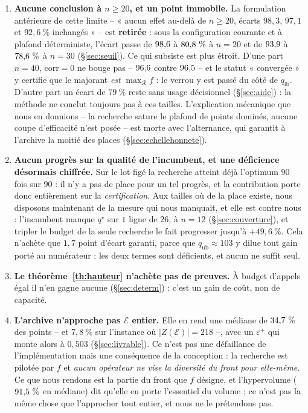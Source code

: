 \documentclass[11pt,a4paper]{article}
\theoremstyle{plain}
\theoremstyle{remark}
\newcommand{\Ecal}{\mathcal{E}}
\newcommand{\Rcal}{\mathcal{R}}
\newcommand{\qs}{q^{\star}}
\begin{document}
\begin{enumerate}[leftmargin=*,itemsep=3pt]
\item \textbf{Aucune conclusion à $n\ge 20$, et un point immobile.} La
      formulation antérieure de cette limite -- « aucun effet au-delà de
      $n\ge 20$, écarts $98{,}3$, $97{,}1$ et $92{,}6\ \%$ inchangés » -- est
      \textbf{retirée} : sous la configuration courante et à plafond
      déterministe, l'écart passe de $98{,}6{}$ à $80{,}8{}\ \%$ à $n=20$ et de
      $93{,}9{}$ à $78{,}6{}\ \%$ à $n=30$ (§\ref{sec:seuil}). Ce qui subsiste
      est plus étroit. D'une part $n=40$, $\text{corr}=0$ ne bouge pas --
      $96{,}6{}$ contre $96{,}5{}$ -- et le statut « convergée » y certifie que
      le majorant \emph{est} $\max_{\Rcal}f$ : le verrou y est passé du côté
      de $q_{\text{lb}}$. D'autre part un écart de $79\ \%$ reste sans usage
      décisionnel (§\ref{sec:aide}) : la méthode ne conclut toujours pas à
      ces tailles. L'explication mécanique que nous en donnions -- la
      recherche sature le plafond de points dominés, aucune coupe
      d'efficacité n'est posée -- est morte avec l'alternance, qui garantit
      à l'archive la moitié des places (§\ref{sec:echellehonnete}).
\item \textbf{Aucun progrès sur la qualité de l'incumbent, et une
      déficience désormais chiffrée.} Sur le lot figé la recherche atteint
      déjà l'optimum $90$ fois sur $90$ : il n'y a pas de place pour un tel
      progrès, et la contribution porte donc entièrement sur la
      \emph{certification}. Aux tailles où de la place existe, nous
      disposons maintenant de la mesure qui nous manquait, et elle est
      contre nous : l'incumbent manque $\qs$ sur $1$ ligne de $26$, à
      $n=12$ (§\ref{sec:couverture}), et tripler le budget de la seule
      recherche le fait progresser jusqu'à $+49{,}6\ \%$. Cela n'achète que
      $1{,}7$ point d'écart garanti, parce que $q_{\text{ub}}\approx 103$ y
      dilue tout gain porté au numérateur : les deux termes sont
      déficients, et aucun ne suffit seul.
\item \textbf{Le théorème~\ref{th:hauteur} n'achète pas de preuves.} À
      budget d'appels égal il n'en gagne aucune (\S\ref{sec:determ}) : c'est
      un gain de coût, non de capacité.
\item \textbf{L'archive n'approche pas $\Ecal$ entier.} Elle en rend une
      médiane de $34{,}7{}\ \%$ des points -- et $7{,}8\ \%$ sur l'instance
      où $|Z(\Ecal)|=218$ --, avec un $\varepsilon^+$ qui monte alors à
      $0{,}503$ (§\ref{sec:livrable}). Ce n'est pas une défaillance de
      l'implémentation mais une conséquence de la conception : la recherche
      est pilotée par $f$ et \emph{aucun opérateur ne vise la diversité du
      front pour elle-même}. Ce que nous rendons est la partie du front que
      $f$ désigne, et l'hypervolume ($91{,}5{}\ \%$ en médiane) dit qu'elle
      en porte l'essentiel du volume ; ce n'est pas la même chose que
      l'approcher tout entier, et nous ne le prétendons pas.
\end{enumerate}
\end{document}
